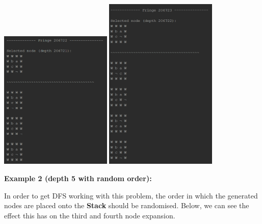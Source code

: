 \documentclass{article}
\begin{document}
	\begin{multicols}{2}[\columnsep=2cm]
		\includegraphics[width=0.4\textwidth,keepaspectratio]{DFS-1-5.png}
		\columnbreak
		\includegraphics[width=0.4\textwidth,keepaspectratio]{DFS-1-6.png}
	\end{multicols}

	\newpage
	\textbf{Example 2 (depth 5 with random order):}
	
	In order to get DFS working with this problem, the order in which the generated nodes are placed onto the \textbf{Stack} should be randomised. Below, we can see the effect this has on the third and fourth node expansion.
	
\end{document}
